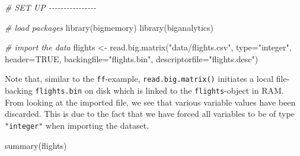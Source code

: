 \documentclass[
  12pt,
]{style/krantz}
\newenvironment{Shaded}{\begin{snugshade}}{\end{snugshade}}
\newcommand{\AttributeTok}[1]{\textcolor[rgb]{0.77,0.63,0.00}{#1}}
\newcommand{\CommentTok}[1]{\textcolor[rgb]{0.56,0.35,0.01}{\textit{#1}}}
\newcommand{\ConstantTok}[1]{\textcolor[rgb]{0.00,0.00,0.00}{#1}}
\newcommand{\FunctionTok}[1]{\textcolor[rgb]{0.00,0.00,0.00}{#1}}
\newcommand{\NormalTok}[1]{#1}
\newcommand{\OtherTok}[1]{\textcolor[rgb]{0.56,0.35,0.01}{#1}}
\newcommand{\StringTok}[1]{\textcolor[rgb]{0.31,0.60,0.02}{#1}}
\begin{document}
\begin{Shaded}
\begin{Highlighting}[]
\CommentTok{\# SET UP {-}{-}{-}{-}{-}{-}{-}{-}{-}{-}{-}{-}{-}{-}{-}{-}}

\CommentTok{\# load packages}
\FunctionTok{library}\NormalTok{(bigmemory)}
\FunctionTok{library}\NormalTok{(biganalytics)}

\CommentTok{\# import the data}
\NormalTok{flights }\OtherTok{\textless{}{-}} \FunctionTok{read.big.matrix}\NormalTok{(}\StringTok{"data/flights.csv"}\NormalTok{,}
                     \AttributeTok{type=}\StringTok{"integer"}\NormalTok{,}
                     \AttributeTok{header=}\ConstantTok{TRUE}\NormalTok{,}
                     \AttributeTok{backingfile=}\StringTok{"flights.bin"}\NormalTok{,}
                     \AttributeTok{descriptorfile=}\StringTok{"flights.desc"}\NormalTok{)}
\end{Highlighting}
\end{Shaded}

Note that, similar to the \texttt{ff}-example, \texttt{read.big.matrix()} initiates a local file-backing \texttt{flights.bin} on disk which is linked to the \texttt{flights}-object in RAM. From looking at the imported file, we see that various variable values have been discarded. This is due to the fact that we have forced all variables to be of type \texttt{"integer"} when importing the dataset.

\begin{Shaded}
\begin{Highlighting}[]
\FunctionTok{summary}\NormalTok{(flights)}
\end{Highlighting}
\end{Shaded}
\end{document}
